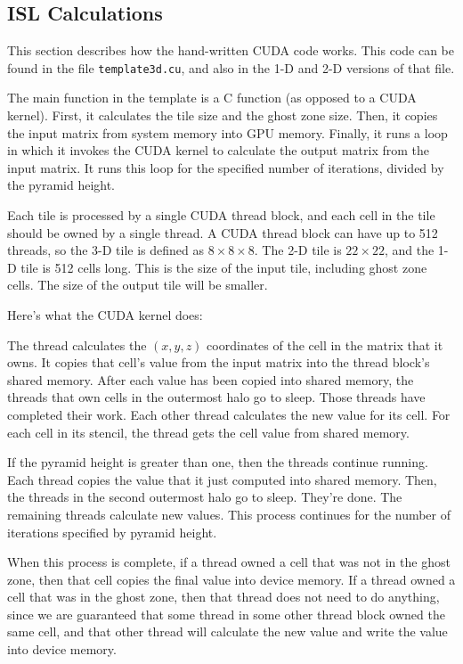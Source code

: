 \documentclass{styles/sig-alternate}
\begin{document}
\subsection{ISL Calculations}

This section describes how the hand-written CUDA code works.  This
code can be found in the file {\tt template3d.cu}, and also in the 1-D
and 2-D versions of that file.

The main function in the template is a C function (as opposed to a
CUDA kernel).  First, it calculates the tile size and the ghost zone
size.  Then, it copies the input matrix from system memory into GPU
memory.  Finally, it runs a loop in which it invokes the CUDA kernel
to calculate the output matrix from the input matrix.  It runs this
loop for the specified number of iterations, divided by the pyramid height.

Each tile is processed by a single CUDA thread block, and each cell in
the tile should be owned by a single thread.  A CUDA thread block can
have up to 512 threads, so the 3-D tile is defined as $8 \times 8
\times 8$.  The 2-D tile is $22 \times 22$, and the 1-D tile is 512
cells long.  This is the size of the input tile, including ghost zone
cells.  The size of the output tile will be smaller.

Here's what the CUDA kernel does:

The thread calculates the $(x, y, z)$ coordinates of the cell in the
matrix that it owns.  It copies that cell's value from the input
matrix into the thread block's shared memory.  After each value has
been copied into shared memory, the threads that own cells in the
outermost halo go to sleep.  Those threads have completed their work.
Each other thread calculates the new value for its cell.  For each
cell in its stencil, the thread gets the cell value from shared
memory.

If the pyramid height is greater than one, then the threads continue
running.  Each thread copies the value that it just computed into
shared memory.  Then, the threads in the second outermost halo go to
sleep.  They're done.  The remaining threads calculate new values.
This process continues for the number of iterations specified by
pyramid height.

When this process is complete, if a thread owned a cell that was not
in the ghost zone, then that cell copies the final value into device
memory.  If a thread owned a cell that was in the ghost zone, then
that thread does not need to do anything, since we are guaranteed that
some thread in some other thread block owned the same cell, and that
other thread will calculate the new value and write the value into
device memory.
\end{document}
